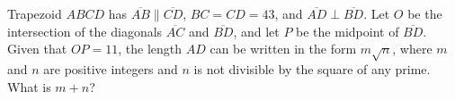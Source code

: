 Trapezoid $ABCD$ has $\overline{AB}\parallel\overline{CD}$, $BC=CD=43$, and $\overline{AD}\perp\overline{BD}$. Let $O$ be the intersection of the diagonals $\overline{AC}$ and $\overline{BD}$, and let $P$ be the midpoint of $\overline{BD}$. Given that $OP=11$, the length $AD$ can be written in the form $m\sqrt n$, where $m$ and $n$ are positive integers and $n$ is not divisible by the square of any prime. What is $m+n$?
